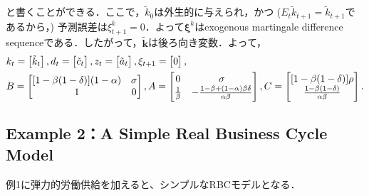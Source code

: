 \documentclass[a4j, dvipdfmx]{jarticle}
\begin{document}
と書くことができる．ここで，$\tilde k_0$は外生的に与えられ，かつ ($E_t\tilde k_{t+1} = \tilde k_{t+1}$であるから，) 予測誤差は$\xi^k_{t+1} = 0$．よって$ \boldsymbol{\xi}^k$はexogenous martingale difference sequenceである．したがって，$\boldsymbol{\tilde k}$は後ろ向き変数．よって，
\begin{align}
&k_t = \begin{bmatrix}\tilde k_t\end{bmatrix}, d_t = \begin{bmatrix}\tilde c_t\end{bmatrix}, z_t = \begin{bmatrix}\tilde a_t\end{bmatrix},\xi_{t+1} = \begin{bmatrix}0\end{bmatrix}, \notag \\
&B = \begin{bmatrix}[1-\beta(1-\delta)](1-\alpha) & \sigma \\
1 & 0 \end{bmatrix}, 
A = \begin{bmatrix}0 & \sigma \\
\frac{1}{\beta} & -\frac{1-\beta+(1-\alpha)\beta\delta}{\alpha\beta}\end{bmatrix},
C = \begin{bmatrix}[1-\beta(1-\delta)]\rho \\ \frac{1-\beta(1-\delta)}{\alpha\beta}\end{bmatrix}.
\end{align}


\subsection{Example 2：A Simple Real Business Cycle Model}

例1に弾力的労働供給を加えると、シンプルなRBCモデルとなる．
\end{document}
